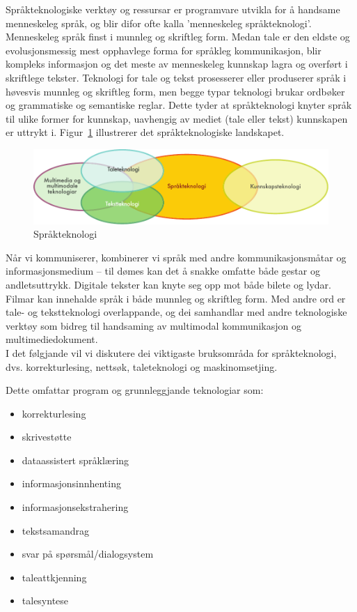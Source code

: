 \begin{multicols}{2}

Språkteknologiske verktøy og ressursar er programvare utvikla for å handsame menneskeleg språk, og blir difor ofte kalla 'menneskeleg språkteknologi'. 
Menneskeleg språk finst i munnleg og skriftleg form. Medan tale er den eldste og evolusjonsmessig mest opphavlege forma for språkleg kommunikasjon, blir kompleks informasjon og det meste av menneskeleg kunnskap lagra og overført i skriftlege tekster. Teknologi for tale og tekst prosesserer eller produserer språk i høvesvis munnleg og skriftleg form, men begge typar teknologi brukar ordbøker og grammatiske og semantiske reglar. Dette tyder at språkteknologi knyter språk til ulike former for kunnskap, uavhengig av mediet (tale eller tekst) kunnskapen er uttrykt i. Figur~\ref{fig:ltincontext_no} illustrerer det språkteknologiske landskapet.

\begin{figure}[htb]
  \center
  \includegraphics[width=\textwidth]{../_media/norwegian-nynorsk/language_technologies}
  \caption{Språkteknologi}
  \label{fig:ltincontext_no}
\end{figure}

Når vi kommuniserer, kombinerer vi språk med andre kommunikasjonsmåtar og informasjonsmedium – til dømes kan det å snakke omfatte både gestar og andletsuttrykk. Digitale tekster kan knyte seg opp mot både bilete og lydar. Filmar kan innehalde språk i både munnleg og skriftleg form. Med andre ord er tale- og tekstteknologi overlappande, og dei samhandlar med andre teknologiske verktøy som bidreg til handsaming av multimodal kommunikasjon og multimediedokument.\\ 
I det følgjande vil vi diskutere dei viktigaste bruksområda for språkteknologi, dvs. korrekturlesing, nettsøk, taleteknologi og maskinomsetjing. 

Dette omfattar program og grunnleggjande teknologiar som:

\begin{itemize}
\item korrekturlesing
\item skrivestøtte
\item dataassistert språklæring
\item informasjonsinnhenting  
\item informasjonsekstrahering
\item tekstsamandrag
\item svar på spørsmål/dialogsystem
\item taleattkjenning 
\item talesyntese 
\end{itemize}


\end{multicols}
